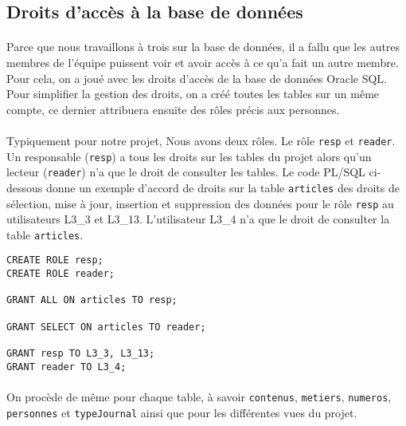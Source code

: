 \subsection{Droits d'acc\`{e}s \`{a} la base de donn\'{e}es}

\paragraph{}{
    Parce que nous travaillons \`{a} trois sur la base de donn\'{e}es, il a fallu que les autres membres de l'\'{e}quipe puissent voir et avoir acc\`{e}s \`{a} ce qu'a fait un autre membre. Pour cela, on a jou\'{e} avec les droits d'acc\`{e}s de la base de donn\'{e}es Oracle SQL. Pour simplifier la gestion des droits, on a cr\'{e}\'{e} toutes les tables sur un même compte, ce dernier attribuera ensuite des r\^{o}les pr\'{e}cis aux personnes.
}

\paragraph{}{
    Typiquement pour notre projet, Nous avons deux r\^{o}les. Le r\^{o}le \verb|resp| et \verb|reader|. Un responsable (\verb|resp|) a tous les droits sur les tables du projet alors qu'un lecteur (\verb|reader|) n'a que le droit de consulter les tables. Le code PL/SQL ci-dessous donne un exemple d'accord de droits sur la table \verb|articles| des droits de s\'{e}lection, mise \`{a} jour, insertion et suppression des donn\'{e}es pour le r\^{o}le \verb|resp| au utilisateurs L3\_3 et L3\_13. L'utilisateur L3\_4 n'a que le droit de consulter la table \verb|articles|.
}

\begin{lstlisting}[frame=single]
CREATE ROLE resp;
CREATE ROLE reader;

GRANT ALL ON articles TO resp;

GRANT SELECT ON articles TO reader;

GRANT resp TO L3_3, L3_13;
GRANT reader TO L3_4;
\end{lstlisting}

\paragraph{}{
    On proc\`{e}de de même pour chaque table, \`{a} savoir \verb|contenus|, \verb|metiers|, \verb|numeros|, \verb|personnes| et \verb|typeJournal| ainsi que pour les diff\'{e}rentes vues du projet.
}

